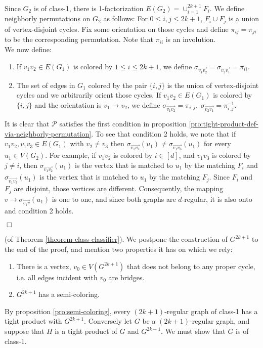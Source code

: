 \documentclass[12pt]{article}
\newtheorem{open question}[theorem]{Open question}
\newcommand{\proof}{{\par\noindent {\bf Proof}\space\space}}
\newcommand{\proofbox}{\begin{flushright}$\Box$\end{flushright}}
\begin{document}
Since $G_2$ is of class-1, there is 1-factorization $E(G_2)=\cup_{i=1}^{2k+1}F_i$. We define neighborly permutations on $G_2$ as follows: For $0\le i , j \le 2k+1$, $F_i\cup F_j$ is a union of vertex-disjoint cycles. Fix some orientation on those cycles and define $\pi_{ij}=\pi_{ji}$ to be the corresponding permutation. Note that $\pi_{ii}$ is an involution.\\
We now define:
\begin{enumerate}
\item If $v_1v_2\in E(G_1)$ is colored by $1\le i\le 2k+1$, we define $\sigma_{\overrightarrow{v_1v_2}}=\sigma_{\overrightarrow{v_2v_1}}=\pi_{ii}$.
\item The set of edges in $G_1$ colored by the pair $\{i,j\}$ is the union of vertex-disjoint cycles and we arbitrarily orient those cycles. If $v_1v_2\in E(G_1)$ is colored by $\{i,j\}$ and the orientation is $v_1\to v_2$, we define $\sigma_{\overrightarrow{v_1v_2}}=\pi_{i,j},\;\sigma_{\overrightarrow{v_2v_1}}=\pi^{-1}_{i,j}$.
\end{enumerate}
It is clear that $\mathscr{P}$ satisfies the first condition in proposition \ref{pro:tight-product-def-via-neighborly-permutation}.
To see that condition 2 holds, we note that if $v_1v_2,v_1v_3\in E(G_1)$ with $v_2\ne v_3$ then 
$\sigma_{\overrightarrow{v_1v_2}}(u_1)\ne\sigma_{\overrightarrow{v_1v_3}}(u_1)$ for every $u_1\in V(G_2)$. 
For example, if $v_1v_2$ is colored by $i\in [d]$, and $v_1v_3$ is colored by $j\ne i$, then 
$\sigma_{\overrightarrow{v_1v_2}}(u_1)$ is the vertex that is matched to $u_1$ by the matching $F_i$ and 
$\sigma_{\overrightarrow{v_1v_3}}(u_1)$ is the vertex that is matched to 
$u_1$ by the matching $F_j$. Since $F_i$ and $F_j$ are disjoint, those vertices are different. 
Consequently, the mapping $v\rightarrow\sigma_{\overrightarrow{v_1v}}(u_1)$ is one to one, 
and since both graphs are $d$-regular, it is also onto and condition 2 holds.  
\proofbox

\proof (of Theorem \ref{theorem-class-classifier}).
We postpone the construction of $G^{2k+1}$ to the end of the proof, and mention two properties it has on which we rely:
\begin{enumerate}
\item There is a vertex, $v_0 \in V(G^{2k+1})$ that does not belong
to any proper cycle, i.e. all edges incident with $v_0$ are bridges.
\item $G^{2k+1}$ has a semi-coloring.
\end{enumerate}
By proposition \ref{pro:semi-coloring}, every $(2k+1)$-regular graph of class-1 has a tight product with $G^{2k+1}$. Conversely let $G$ be a $(2k+1)$-regular graph, and suppose that $H$ is a tight product of $G$ and $G^{2k+1}$. We must show that $G$ is of class-1.
\end{document}
